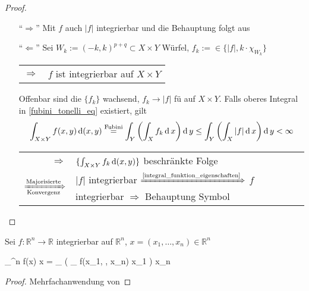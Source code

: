 \begin{proof}\hspace*{0pt}
	\NoEndMark
	\begin{itemize}
		\item["`$\Rightarrow$"'] Mit $f$ auch $\vert f \vert$ integrierbar und die Behauptung folgt aus 
		
		\item["`$\Leftarrow$"'] Sei $W_k := (-k,k)^{p+q}\subset X\times Y$ Würfel, $f_k := \in \{ \vert f \vert, k\cdot \chi_{W_k} \}$ \\
		\begin{tabularx}{\linewidth}{r@{\ \ }X}
		$\Rightarrow$ & $f$ ist integrierbar auf $X\times Y$
		\end{tabularx}
		
		Offenbar sind die $\{ f_k \}$ wachsend, $f_k\to \vert f \vert$ \gls{fü} auf $X\times Y$. Falls oberes Integral in \eqref{fubini_tonelli_eq} existiert, gilt \begin{align*}
			\int_{X\times Y} f(x,y) \operatorname{d}(x,y) \overset{\text{Fubini}}{=} \int_Y \left( \int_X f_k \operatorname{d} x\right) \operatorname{d} y \le \int_Y \left( \int_X \vert f \vert \operatorname{d} x \right)\operatorname{d} y < \infty
		\end{align*}
		\begin{tabularx}{\linewidth}{r@{\ \ }X}
		$\Rightarrow$ & $\{\int_{X\times Y} f_k \operatorname{d} (x,y)\}$ beschränkte Folge \\
		$\xRightarrow[\text{Konvergenz}]{\text{Majorisierte}}$ & $\vert f \vert$ integrierbar $\xRightarrow{\text{\cref{integral_funktion_eigenschaften}}}$ $f$ integrierbar $\Rightarrow$ Behauptung \hfill\csname\InTheoType Symbol\endcsname
	\end{tabularx}
	\end{itemize}
\end{proof}

\begin{conclusion}
	Sei $f:\mathbb{R}^n\to\mathbb{R}$ integrierbar auf $\mathbb{R}^n$, $x = (x_1, \dotsc, x_n)\in\mathbb{R}^n$
	\begin{flalign}
		\Rightarrow\;\;\int_{^n} f(x) \D x = \int_ \dotsc \left( \int_ f(x_1, \dotsc, x_n) \D x_1 \right) \dotsc \D x_n
	\end{flalign}
\end{conclusion}
\begin{proof}
	Mehrfachanwendung von 
\end{proof}


